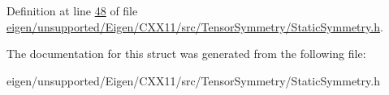 Definition at line \hyperlink{eigen_2unsupported_2_eigen_2_c_x_x11_2src_2_tensor_symmetry_2_static_symmetry_8h_source_l00048}{48} of file \hyperlink{eigen_2unsupported_2_eigen_2_c_x_x11_2src_2_tensor_symmetry_2_static_symmetry_8h_source}{eigen/unsupported/\+Eigen/\+C\+X\+X11/src/\+Tensor\+Symmetry/\+Static\+Symmetry.\+h}.



The documentation for this struct was generated from the following file\+:\begin{DoxyCompactItemize}
\item 
eigen/unsupported/\+Eigen/\+C\+X\+X11/src/\+Tensor\+Symmetry/\+Static\+Symmetry.\+h\end{DoxyCompactItemize}
